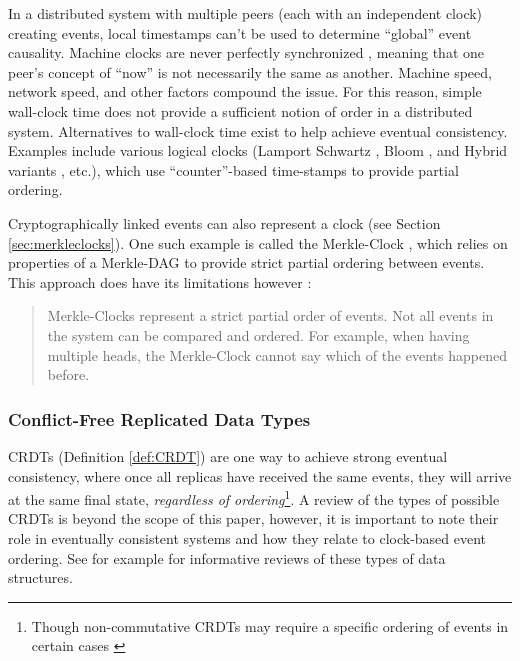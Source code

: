 \documentclass{textile}
\begin{document}
In a distributed system with multiple peers (each with an independent clock) creating events, local timestamps can't be used to determine ``global'' event causality. Machine clocks are never perfectly synchronized \cite{lamportTimeClocksOrdering1978}, meaning that one peer's concept of ``now'' is not necessarily the same as another. Machine speed, network speed, and other factors compound the issue. For this reason, simple wall-clock time does not provide a sufficient notion of order in a distributed system. Alternatives to wall-clock time exist to help achieve eventual consistency. Examples include various logical clocks (Lamport \cite{lamportTimeClocksOrdering1978} Schwartz \cite{schwarzDetectingCausalRelationships1994}, Bloom \cite{ramabajaBloomClock2019}, and Hybrid variants \cite{kulkarniLogicalPhysicalClocks2014}, etc.), which use ``counter''-based time-stamps to provide partial ordering. 

Cryptographically linked events can also represent a clock (see Section \ref{sec:merkleclocks}). One such example is called the Merkle-Clock \cite{sanjuanMerkleCRDTs2019}, which relies on properties of a Merkle-DAG to provide strict partial ordering between events. This approach does have its limitations however \cite[sec. 4.3]{sanjuanMerkleCRDTs2019}:

\begin{quote}
Merkle-Clocks represent a strict partial order of events. Not all events in the system can be compared and ordered. For example, when having multiple heads, the Merkle-Clock cannot say which of the events happened before.
\end{quote}

\subsubsection{Conflict-Free Replicated Data Types}\label{sec:CRDTs}

CRDTs (Definition \ref{def:CRDT}) are one way to achieve strong eventual consistency, where once all replicas have received the same events, they will arrive at the same final state, \emph{regardless of ordering}\footnote{Though non-commutative CRDTs may require a specific ordering of events in certain cases \cite{sanjuanMerkleCRDTs2019}}. A review of the types of possible CRDTs is beyond the scope of this paper, however, it is important to note their role in eventually consistent systems and how they relate to clock-based event ordering. See for example \cite{enesSingleWriterPrincipleCRDT2017,sanjuanMerkleCRDTs2019} for informative reviews of these types of data structures.
\end{document}
